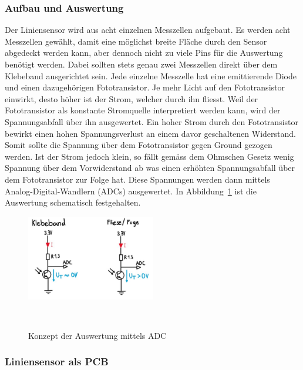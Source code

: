 \documentclass[main.tex]{subfiles} %
\begin{document}
\subsubsection*{Aufbau und Auswertung}
Der Liniensensor wird aus acht einzelnen Messzellen aufgebaut. Es werden acht Messzellen
gewählt, damit eine möglichst breite Fläche durch den Sensor abgedeckt werden kann, aber
dennoch nicht zu viele Pins für die Auswertung benötigt werden. Dabei sollten stets genau
zwei Messzellen direkt über dem Klebeband ausgerichtet sein. Jede einzelne Messzelle hat 
eine emittierende Diode und einen dazugehörigen Fototransistor. Je mehr Licht auf den 
Fototransistor einwirkt, desto höher ist der Strom, welcher durch ihn fliesst. Weil der 
Fototransistor als konstante Stromquelle interpretiert werden kann, wird der Spannungsabfall
über ihn ausgewertet. Ein hoher Strom durch den Fototransistor bewirkt einen hohen 
Spannungsverlust an einem davor geschaltenen Widerstand. Somit sollte die Spannung über dem
Fototransistor gegen Ground gezogen werden. Ist der Strom jedoch klein,
so fällt gemäss dem Ohmschen Gesetz wenig Spannung über dem Vorwiderstand ab was einen erhöhten
Spannungsabfall über dem Fototransistor zur Folge hat. Diese Spannungen werden dann mittels
Analog-Digital-Wandlern (ADCs) ausgewertet. In Abbildung~\ref{fig:Auswertung_Liniensensor1} ist 
die Auswertung schematisch festgehalten.

\begin{figure}[H]
    \centering
    \includegraphics[width=0.5\textwidth]{fig_Strecke_Tracken/Auswertung_Liniensensor.pdf}
    \caption{Konzept der Auswertung mittels ADC}~\label{fig:Auswertung_Liniensensor1}
\end{figure}






\subsubsection{Liniensensor als PCB}
\end{document}
